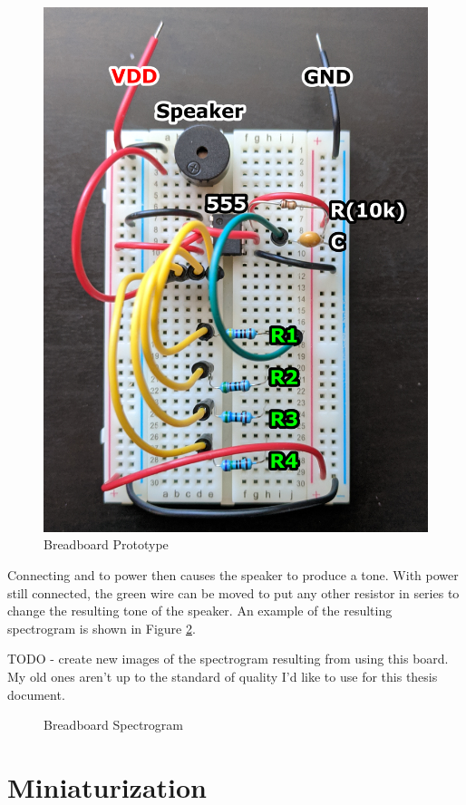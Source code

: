 \begin{figure}[h]
    \centering
    \caption{Breadboard Prototype}
    \label{fig:breadboard}
    \includegraphics[width=.8\linewidth]{Figures/6 PCB Design/breadboard.png}
\end{figure}

Connecting  and  to power then causes the speaker
to produce a tone. With power still connected, the green wire can be
moved to put any other resistor in series to change the resulting tone
of the speaker. An example of the resulting spectrogram is shown in
Figure \ref{fig:breadboard-spectrogram}.

TODO - create new images of the spectrogram resulting from using this
board. My old ones aren't up to the standard of quality I'd like to use
for this thesis document.

\begin{figure}[h]
    \centering
    \caption{Breadboard Spectrogram}
    \label{fig:breadboard-spectrogram}
\end{figure}


\section{Miniaturization}

